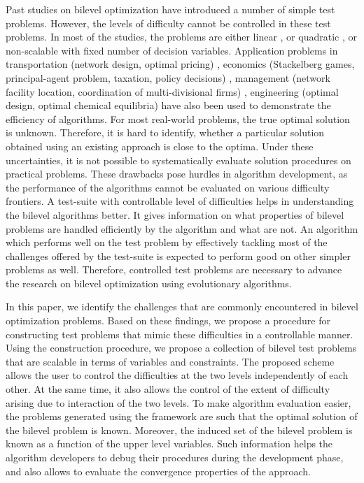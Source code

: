 \documentclass[twoside]{article}
\begin{document}
Past studies \citep{mitsos06} on bilevel optimization have introduced a number of simple test problems. However, the levels of difficulty cannot be controlled in these test problems. In most of the studies, the problems are either linear \citep{moshirvaziri96}, or quadratic \citep{calamai92,calamai94}, or non-scalable with fixed number of decision variables.
Application problems in transportation (network design, optimal pricing) \citep{migdalas95,constantin95,brotcorne01}, economics (Stackelberg games, principal-agent problem, taxation, policy decisions) \citep{fudenberg93,stackelbergWang01,my-caor13,my-cec13}, management (network facility location, coordination of multi-divisional firms) \citep{sun08,bard83}, engineering (optimal design, optimal chemical equilibria) \citep{kirjnerneto98,smith82} have also been used to demonstrate the efficiency of algorithms. For most real-world problems, the true optimal solution is unknown. Therefore, it is hard to identify, whether a particular solution obtained using an existing approach is close to the optima. Under these uncertainties, it is not possible to systematically evaluate solution procedures on practical problems. These drawbacks pose hurdles in algorithm development, as the performance of the algorithms cannot be evaluated on various difficulty frontiers. A test-suite with controllable level of difficulties helps in understanding the bilevel algorithms better. It gives information on what properties of bilevel problems are handled efficiently by the algorithm and what are not. An algorithm which performs well on the test problem by effectively tackling most of the challenges offered by the test-suite is expected to perform good on other simpler problems as well. Therefore, controlled test problems are necessary to advance the research on bilevel optimization using evolutionary algorithms.

In this paper, we identify the challenges that are commonly encountered in bilevel optimization problems. Based on these findings, we propose a procedure for constructing test problems that mimic these difficulties in a controllable manner. Using the construction procedure, we propose a collection of bilevel test problems that are scalable in terms of variables and constraints. The proposed scheme allows the user to control the difficulties at the two levels independently of each other. At the same time, it also allows the control of the extent of difficulty arising due to interaction of the two levels. To make algorithm evaluation easier, the problems generated using the framework are such that the optimal solution of the bilevel problem is known. Moreover, the induced set of the bilevel problem is known as a function of the upper level variables. Such information helps the algorithm developers to debug their procedures during the development phase, and also allows to evaluate the convergence properties of the approach. 
\end{document}
